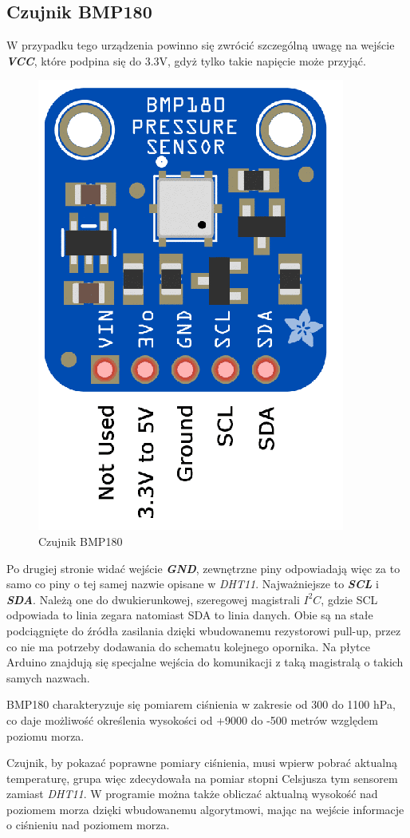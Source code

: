 \documentclass[polish, 11pt]{article}
\begin{document}
\subsection{Czujnik BMP180}
W przypadku tego urządzenia powinno się zwrócić szczególną uwagę na wejście \textbf{\textit{VCC}}, które podpina się do 3.3V, gdyż tylko takie napięcie może przyjąć. 
\begin{figure}[H]
    \centering
    \includegraphics[scale=0.3]{bmp180.png}
\caption{Czujnik BMP180}
\end{figure}
Po drugiej stronie widać wejście \textbf{\textit{GND}}, zewnętrzne piny odpowiadają więc za to samo co piny o tej samej nazwie opisane w \textit{DHT11}. Najważniejsze to \textbf{\textit{SCL}} i \textbf{\textit{SDA}}. Należą one do dwukierunkowej, szeregowej magistrali $I^2C$, gdzie SCL odpowiada to linia zegara natomiast SDA to linia danych. Obie są na stałe podciągnięte do źródła zasilania dzięki wbudowanemu rezystorowi pull-up, przez co nie ma potrzeby dodawania do schematu kolejnego opornika. Na płytce Arduino znajdują się specjalne wejścia do komunikacji z taką magistralą o takich samych nazwach. 

\par BMP180 charakteryzuje się pomiarem ciśnienia w zakresie od 300 do 1100 hPa, co daje  możliwość określenia wysokości od +9000 do -500 metrów względem poziomu morza.
\par Czujnik, by pokazać poprawne pomiary ciśnienia, musi wpierw pobrać aktualną temperaturę, grupa więc zdecydowała na pomiar stopni Celsjusza tym sensorem zamiast \textit{DHT11}. 
W programie można także obliczać aktualną wysokość nad poziomem morza dzięki wbudowanemu algorytmowi, mając na wejście informacje o ciśnieniu nad poziomem morza. 
\end{document}
